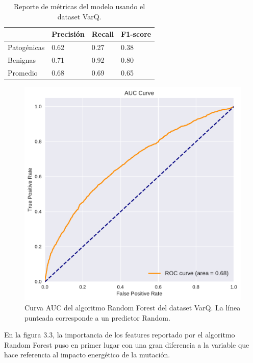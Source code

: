 \begin{table}[H]
\centering
\begin{tabular}{|l|l|l|l|}
\hline
              & Precisión & Recall & F1-score \\ \hline
Patogénicas   & 0.62      & 0.27   & 0.38     \\ \hline
Benignas      & 0.71      & 0.92   & 0.80     \\ \hline
Promedio      & 0.68      & 0.69   & 0.65     \\ \hline   
\end{tabular}
\caption{Reporte de métricas del modelo usando el dataset VarQ.}

\label{fig:metrics_varq}
\end{table}

\begin{figure}[h]
    \centering
    \includegraphics[scale=0.55]{documents/latex/figures/3/auc_varq.pdf}
    \caption{Curva AUC del algoritmo Random Forest del dataset VarQ. La línea punteada corresponde a un predictor Random. }
    \label{fig:auc_varq}
\end{figure}

En la figura 3.3, la importancia de los features reportado por el algoritmo Random Forest puso en primer lugar con una gran diferencia a la variable que hace referencia al impacto energético de la mutación.  

